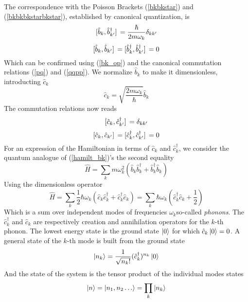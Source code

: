 The correspondence with the Poisson Brackets (\ref{bkbkstar}) and (\ref{bkbkbkstarbkstar}), established by canonical quantization, is
\begin{equation}
    \comm*{\hat{b}_k}{\hat{b}_{k^\prime}^\dagger}=\frac{\hbar}{2m\omega_k}\delta_{kk^\prime}
\end{equation}
\begin{equation}
    \comm*{\hat{b}_k}{\hat{b}_{k^\prime}}=\comm*{\hat{b}_k^\dagger}{\hat{b}_{k^\prime}^\dagger}=0
\end{equation}
Which can be confirmed using (\ref{bk_op}) and the canonical commutation relations (\ref{pq}) and (\ref{qqpp}).
We normalize $\hat{b}_{k}$ to make it dimensionless, introducting $\hat{c}_k$
\begin{equation}
    \hat{c}_k=\sqrt{\frac{2m\omega_k}{\hbar}}\hat{b}_k
    \label{ck}
\end{equation}
The commutation relations now reads
\begin{equation}
    \comm*{\hat{c}_k}{\hat{c}_{k^\prime}^\dagger}=\delta_{kk^\prime}
\end{equation}
\begin{equation}
    \comm*{\hat{c}_k}{\hat{c}_{k^\prime}}=\comm*{\hat{c}_k^\dagger}{\hat{c}_{k^\prime}^\dagger}=0
\end{equation}
For an expression of the Hamiltonian in terms of $\hat{c}_k$ and $\hat{c}^\dagger_k$, we consider the quantum analogue of (\ref{hamilt_bk})'s the second equality
\begin{equation}
    \hat{H}=\sum_{k} m \omega_{k}^{2}\left(\hat{b}_{k} \hat{b}_{k}^{\dagger}+\hat{b}_{k}^{\dagger} \hat{b}_{k}\right)
\end{equation}
Using the dimensionless operator
\begin{equation}
    \hat{H}=\sum_{k} \frac{1}{2}\hbar\omega_{k}\left(\hat{c}_{k} \hat{c}_{k}^{\dagger}+\hat{c}_{k}^{\dagger} \hat{c}_{k}\right)=\sum_{k} \hbar\omega_{k}\left(\hat{c}_{k}^{\dagger} \hat{c}_{k}+\frac{1}{2}\right)
\end{equation}
Which is a sum over independent modes of frequencies $\omega_k$\textemdash so-called \textit{phonons}. The $\hat{c}_{k}^{\dagger}$ and $\hat{c}_{k}$ are respectively creation and annihilation operators for the $k$-th phonon. The lowest energy state is the ground state $\ket{0}$ for which $\hat{c}_k\ket{0}=0$. A general state of the $k$-th mode is built from the ground state
\begin{equation}
    \ket{n_k}=\frac{1}{\sqrt{n_k!}}(\hat{c}_k^\dagger)^{n_k}\ket{0}
\end{equation}
And the state of the system is the tensor product of the individual modes states
\begin{equation}
    \ket{n}=\ket{n_1,n_2\dots}=\prod_{k}\ket{n_k}
\end{equation}

